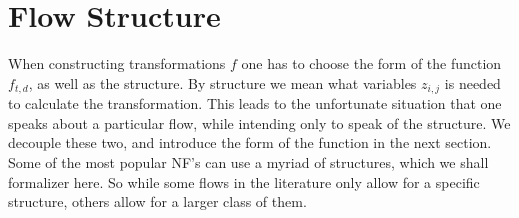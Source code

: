 \section{Flow Structure}\label{seq:struct}
When constructing transformations \(f\) one has to choose 
the form of the function \(f_{t,d}\), as well as the structure. By
structure we mean what variables \(z_{i,j}\) is needed to calculate the
transformation. This leads to the unfortunate situation that one speaks 
about a particular flow, while intending only to speak of the structure. We
decouple these two, and introduce the form of the function in the next section.
Some of the most popular NF's can use a myriad of structures, which we shall
formalizer here. So while some flows in the literature only allow for a
specific structure, others allow for a larger class of them.

